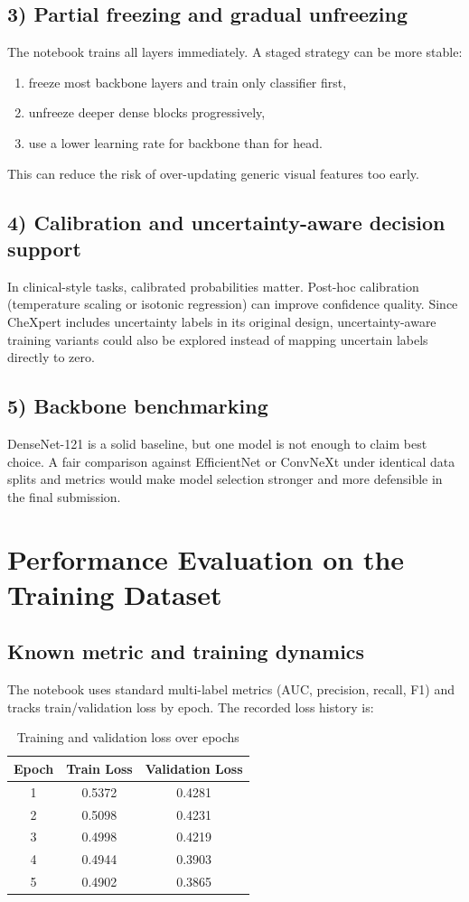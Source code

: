 \documentclass[12pt]{article}
\begin{document}
\subsection{3) Partial freezing and gradual unfreezing}
The notebook trains all layers immediately. A staged strategy can be more stable:
\begin{enumerate}
    \item freeze most backbone layers and train only classifier first,
    \item unfreeze deeper dense blocks progressively,
    \item use a lower learning rate for backbone than for head.
\end{enumerate}
This can reduce the risk of over-updating generic visual features too early.

\subsection{4) Calibration and uncertainty-aware decision support}
In clinical-style tasks, calibrated probabilities matter. Post-hoc calibration (temperature scaling or isotonic regression) can improve confidence quality. Since CheXpert includes uncertainty labels in its original design, uncertainty-aware training variants could also be explored instead of mapping uncertain labels directly to zero.

\subsection{5) Backbone benchmarking}
DenseNet-121 is a solid baseline, but one model is not enough to claim best choice. A fair comparison against EfficientNet or ConvNeXt under identical data splits and metrics would make model selection stronger and more defensible in the final submission.

\section{Performance Evaluation on the Training Dataset}
\subsection{Known metric and training dynamics}
The notebook uses standard multi-label metrics (AUC, precision, recall, F1) and tracks train/validation loss by epoch. The recorded loss history is:

\begin{table}[H]
\centering
\caption{Training and validation loss over epochs}
\begin{tabular}{ccc}
\toprule
Epoch & Train Loss & Validation Loss \\
\midrule
1 & 0.5372 & 0.4281 \\
2 & 0.5098 & 0.4231 \\
3 & 0.4998 & 0.4219 \\
4 & 0.4944 & 0.3903 \\
5 & 0.4902 & 0.3865 \\
\bottomrule
\end{tabular}
\end{table}
\end{document}
